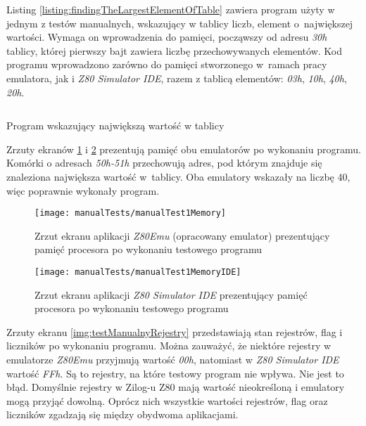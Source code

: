 	Listing \ref{listing:findingTheLargestElementOfTable} zawiera program użyty w jednym z testów manualnych, wskazujący w tablicy liczb, element o~największej wartości. Wymaga on wprowadzenia do pamięci, począwszy od adresu \emph{30h} tablicy, której pierwszy bajt zawiera liczbę przechowywanych elementów.
	Kod programu wprowadzono zarówno do pamięci stworzonego w~ramach pracy emulatora, jak i \emph{Z80 Simulator IDE}, razem z tablicą elementów: \emph{03h}, \emph{10h}, \emph{40h}, \emph{20h}. 
	
	\begin{listing}[h]
		\inputminted{asm}{listings/findingTheLargestElementOfTable.asm}
		\caption{Program wskazujący największą wartość w tablicy}
		\label{listing:findingTheLargestElementOfTable}
	\end{listing}   
	  \newpage
	Zrzuty ekranów \ref{img:manualTest1Memory} i \ref{img:manualTest1MemoryIDE} prezentują pamięć obu emulatorów po wykonaniu programu. 
	Komórki o adresach \emph{50h-51h} przechowują adres, pod którym znajduje się znaleziona największa wartość w~tablicy. Oba emulatory wskazały na liczbę 40, więc poprawnie wykonały program. 
	
	\begin{figure}[h]
    		\centering
    		\texttt{[image: manualTests/manualTest1Memory]}
    		\caption{Zrzut ekranu aplikacji \emph{Z80Emu} (opracowany emulator) prezentujący pamięć procesora po wykonaniu testowego programu }
    		\label{img:manualTest1Memory}
    \end{figure}
    
    \begin{figure}[h]
    		\centering
    		\texttt{[image: manualTests/manualTest1MemoryIDE]}
    		\caption{Zrzut ekranu aplikacji \emph{Z80 Simulator IDE} prezentujący pamięć procesora po wykonaniu testowego programu}
    		\label{img:manualTest1MemoryIDE}
    \end{figure}
    
    Zrzuty ekranu \ref{img:testManualnyRejestry} przedstawiają stan rejestrów, flag i liczników po wykonaniu programu. Można zauważyć, że niektóre rejestry w emulatorze \emph{Z80Emu} przyjmują wartość \emph{00h}, natomiast w \emph{ Z80 Simulator IDE} wartość \emph{FFh}. Są to rejestry, na które testowy program  nie wpływa. Nie jest to błąd. Domyślnie rejestry w Zilog-u Z80 mają wartość nieokreśloną i emulatory mogą przyjąć dowolną. Oprócz nich wszystkie wartości rejestrów, flag oraz liczników zgadzają się między obydwoma aplikacjami.
    
